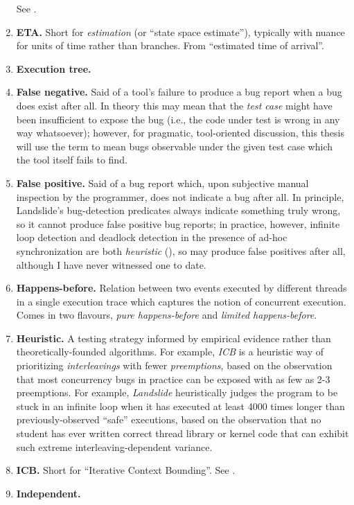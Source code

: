 \begin{enumerate}
		See \sect{\ref{sec:landslide-estimate}}.
	\item {\bf ETA.}
		Short for {\em estimation} (or ``state space estimate''),
		typically with nuance for units of time rather than branches.
		From ``estimated time of arrival''.
	\item {\bf Execution tree.}
	\item {\bf False negative.}
		Said of a tool's failure to produce a bug report when a bug does exist after all.
		In theory this may mean that the {\em test case} might have been insufficient to expose the bug
		(i.e., the code under test is wrong in any way whatsoever);
		however, for pragmatic, tool-oriented discussion,
		this thesis will use the term to mean bugs observable under the given test case which the tool itself fails to find.
	\item {\bf False positive.}
		Said of a bug report which,
		upon subjective manual inspection by the programmer,
		does not indicate a bug after all.
		In principle, Landslide's bug-detection predicates always indicate something truly wrong,
		so it cannot produce false positive bug reports;
		in practice, however, infinite loop detection and deadlock detection in the presence of ad-hoc synchronization
		are both {\em heuristic} (\sect{\ref{sec:landslide-blocking}}),
		so may produce false positives after all, although I have never witnessed one to date.
	\item {\bf Happens-before.}
		Relation between two events executed by different threads in a single execution trace
		which captures the notion of concurrent execution.
		Comes in two flavours, {\em pure happens-before} and {\em limited happens-before}.
	\item {\bf Heuristic.}
		A testing strategy informed by empirical evidence rather than theoretically-founded algorithms.
		For example, {\em ICB} is a heuristic way of prioritizing {\em interleavings} with fewer {\em preemptions},
		based on the observation that most concurrency bugs in practice can be exposed with as few as 2-3 preemptions.
		For example, {\em Landslide} heuristically judges the program to be stuck in an infinite loop
		when it has executed at least 4000 times longer than previously-observed ``safe'' executions,
		based on the observation that no student has ever written correct thread library or kernel code
		that can exhibit such extreme interleaving-dependent variance.
	\item {\bf ICB.} Short for ``Iterative Context Bounding''. See \sect{\ref{sec:landslide-icb}}.
	\item {\bf Independent.}

\end{enumerate}
